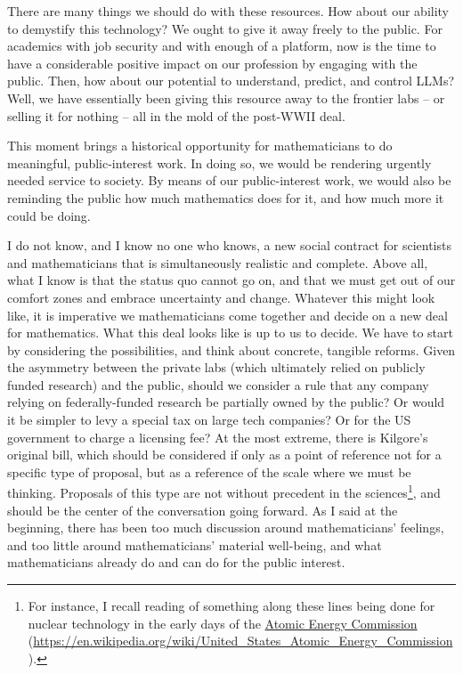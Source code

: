\documentclass[11pt]{amsart}
\begin{document}
There are many things we should do with these resources. How about our ability to demystify this technology? We ought to give it away freely to the public. For academics with job security and with enough of a platform, now is the time to have a considerable positive impact on our profession by engaging with the public. Then, how about our potential to understand, predict, and control LLMs? Well, we have essentially been giving this resource away to the frontier labs -- or selling it for nothing -- all in the mold of the post-WWII deal.

This moment brings a historical opportunity for mathematicians to do meaningful, public-interest work. In doing so, we would be rendering urgently needed service to society. By means of our public-interest work, we would also be reminding the public how much mathematics does for it, and how much more it could be doing.

I do not know, and I know no one who knows, a new social contract for scientists and mathematicians that is simultaneously realistic and complete. Above all, what I know is that the status quo cannot go on, and that we must get out of our comfort zones and embrace uncertainty and change. Whatever this might look like, it is imperative we mathematicians come together and decide on a new deal for mathematics. What this deal looks like is up to us to decide. We have to start by considering the possibilities, and think about concrete, tangible reforms. Given the asymmetry between the private labs (which ultimately relied on publicly funded research) and the public, should we consider a rule that any company relying on federally-funded research be partially owned by the public? Or would it be simpler to levy a special tax on large tech companies? Or for the US government to charge a licensing fee? At the most extreme, there is Kilgore's original bill, which should be considered if only as a point of reference not for a specific type of proposal, but as a reference of the scale where we must be thinking. Proposals of this type are not without precedent in the sciences\footnote{For instance, I recall reading of something along these lines being done for nuclear technology in the early days of the \href{https://en.wikipedia.org/wiki/United_States_Atomic_Energy_Commission}{Atomic Energy Commission} (\url{https://en.wikipedia.org/wiki/United_States_Atomic_Energy_Commission}).}, and should be the center of the conversation going forward. As I said at the beginning, there has been too much discussion around mathematicians' feelings, and too little around mathematicians' material well-being, and what mathematicians already do and can do for the public interest.
\end{document}
